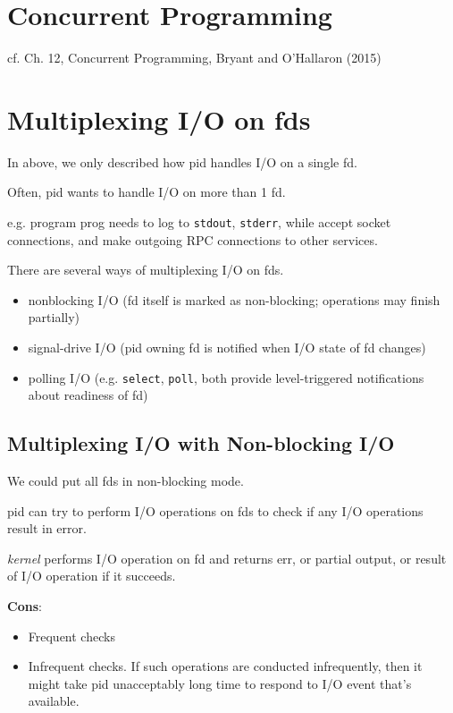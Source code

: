 \documentclass[10pt]{amsart}
\begin{document}
\section{Concurrent Programming}

cf. Ch. 12, Concurrent Programming, Bryant and O'Hallaron (2015) \cite{BrOH2016}



\section{Multiplexing I/O on fds}

In above, we only described how pid handles I/O on a single fd.

Often, pid wants to handle I/O on more than 1 fd.

e.g. program prog needs to log to \texttt{stdout}, \texttt{stderr}, while accept socket connections, and make outgoing RPC connections to other services. 


There are several ways of multiplexing I/O on fds.
\begin{itemize}
	\item nonblocking I/O (fd itself is marked as non-blocking; operations may finish partially)
	\item signal-drive I/O (pid owning fd is notified when I/O state of fd changes)
	\item polling I/O (e.g. \texttt{select}, \texttt{poll}, both provide level-triggered notifications about readiness of fd)
\end{itemize}

\subsection{Multiplexing I/O with Non-blocking I/O}

We could put all fds in non-blocking mode.

pid can try to perform I/O operations on fds to check if any I/O operations result in error.

\emph{kernel} performs I/O operation on fd and returns err, or partial output, or result of I/O operation if it succeeds.

\textbf{Cons}:
\begin{itemize}
	\item Frequent checks
	\item Infrequent checks. If such operations are conducted infrequently, then it might take pid unacceptably long time to respond to I/O event that's available.
\end{itemize}
\end{document}
